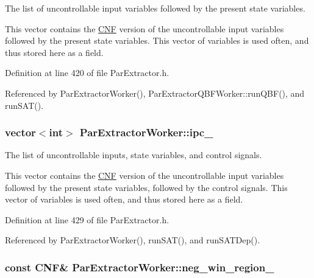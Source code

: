 The list of uncontrollable input variables followed by the present state variables. 

This vector contains the \hyperlink{classCNF}{C\-N\-F} version of the uncontrollable input variables followed by the present state variables. This vector of variables is used often, and thus stored here as a field. 

Definition at line 420 of file Par\-Extractor.\-h.



Referenced by Par\-Extractor\-Worker(), Par\-Extractor\-Q\-B\-F\-Worker\-::run\-Q\-B\-F(), and run\-S\-A\-T().

\hypertarget{classParExtractorWorker_ae9deb9eac6b36f87f299d1eca77351d5}{
\subsubsection[{ipc\-\_\-}]{\setlength{\rightskip}{0pt plus 5cm}vector$<$int$>$ Par\-Extractor\-Worker\-::ipc\-\_\-\hspace{0.3cm}{\ttfamily [protected]}}}\label{classParExtractorWorker_ae9deb9eac6b36f87f299d1eca77351d5}


The list of uncontrollable inputs, state variables, and control signals. 

This vector contains the \hyperlink{classCNF}{C\-N\-F} version of the uncontrollable input variables followed by the present state variables, followed by the control signals. This vector of variables is used often, and thus stored here as a field. 

Definition at line 429 of file Par\-Extractor.\-h.



Referenced by Par\-Extractor\-Worker(), run\-S\-A\-T(), and run\-S\-A\-T\-Dep().

\hypertarget{classParExtractorWorker_a423caaf7f20528eb06b176acc09ae8ee}{
\subsubsection[{neg\-\_\-win\-\_\-region\-\_\-}]{\setlength{\rightskip}{0pt plus 5cm}const {\bf C\-N\-F}\& Par\-Extractor\-Worker\-::neg\-\_\-win\-\_\-region\-\_\-\hspace{0.3cm}{\ttfamily [protected]}}}\label{classParExtractorWorker_a423caaf7f20528eb06b176acc09ae8ee}


